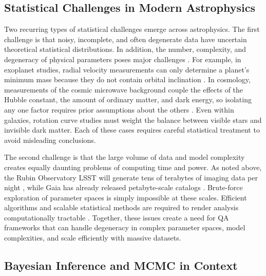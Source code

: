 \documentclass[preprint,longauthor]{aastex631}
\numberwithin{equation}{section}
\begin{document}
\subsection{Statistical Challenges in Modern Astrophysics}

Two recurring types of statistical challenges emerge across astrophysics. The first challenge is that noisy, incomplete, and often degenerate data have uncertain theoretical statistical distributions. In addition, the number, complexity, and degeneracy of physical parameters poses major challenges \citep{schaferFrameworkStatisticalInference2015}. For example, in exoplanet studies, radial velocity measurements can only determine a planet’s minimum mass because they do not contain orbital inclination \citep{lovisRadialVelocityTechniques2010}. In cosmology, measurements of the cosmic microwave background couple the effects of the Hubble constant, the amount of ordinary matter, and dark energy, so isolating any one factor requires prior assumptions about the others \citep{christensenParameterEstimationGravitational2022}. Even within galaxies, rotation curve studies must weight the balance between visible stars and invisible dark matter. Each of these cases requires careful statistical treatment to avoid misleading conclusions.

The second challenge is that the large volume of data and model complexity creates equally daunting problems of computing time and power. As noted above, the Rubin Observatory LSST will generate tens of terabytes of imaging data per night \citep{borneAstroinformatics21stCentury2009}, while Gaia has already released petabyte-scale catalogs \citep{gaiacollaborationGaiaDataRelease2023}. Brute-force exploration of parameter spaces is simply impossible at these scales. Efficient algorithms and scalable statistical methods are required to render analysis computationally tractable \citep{huijseComputationalIntelligenceChallenges2014}. Together, these issues create a need for QA frameworks that can handle degeneracy in complex parameter spaces, model complexities, and scale efficiently with massive datasets.

\subsection{Bayesian Inference and MCMC in Context}
\end{document}
